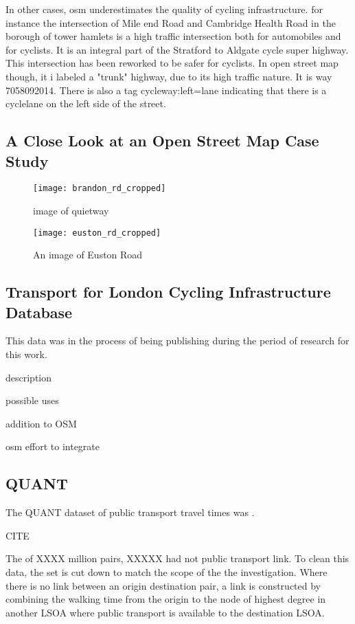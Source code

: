 In other cases, osm underestimates the quality of cycling infrastructure. for instance the intersection of Mile end Road and Cambridge Health Road in the borough of tower hamlets is a high traffic intersection both for automobiles and for cyclists. It is an integral part of the Stratford to Aldgate cycle super highway. This intersection has been reworked to be safer for cyclists. In open street map though, it i labeled a "trunk" highway, due to its high traffic nature. It is way 7058092014. There is also a tag cycleway:left=lane indicating that there is a cyclelane on the left side of the street. 

\cite{osm}

\subsection{A Close Look at an Open Street Map Case Study}

\begin{figure}
\centering
\texttt{[image: brandon\_rd\_cropped]}
\caption{image of quietway}
\end{figure}

\begin{figure}
\centering
\texttt{[image: euston\_rd\_cropped]}
\caption{An image of Euston Road}
\label{fig:euston}
\end{figure}

\subsection{Transport for London Cycling Infrastructure Database}

\cite{tflcid}

This data was in the process of being publishing during the period of research for this work. 

description

possible uses

addition to OSM

osm effort to integrate

\subsection{QUANT}

The QUANT dataset of public transport travel times was .

CITE

The of XXXX million pairs, XXXXX had not public transport link. To clean this data, the set is cut down to match the scope of the the investigation. Where there is no link between an origin destination pair, a link is constructed by combining the walking time from the origin to the node of highest degree in another LSOA where public transport is available to the destination LSOA. 

